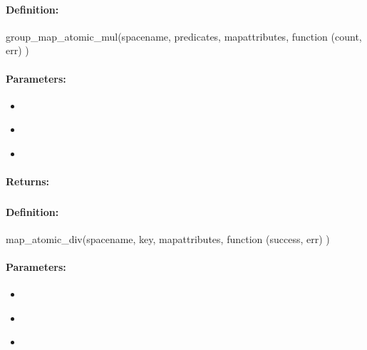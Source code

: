 \paragraph{Definition:}
\begin{javascriptcode}
group_map_atomic_mul(spacename, predicates, mapattributes, function (count, err) {})
\end{javascriptcode}
\paragraph{Parameters:}
\begin{itemize}[noitemsep]
\item {}\\

\item {}\\

\item {}\\

\end{itemize}

\paragraph{Returns:}


\pagebreak
\subsubsection{}
\label{api:nodejs:map_atomic_div}


\paragraph{Definition:}
\begin{javascriptcode}
map_atomic_div(spacename, key, mapattributes, function (success, err) {})
\end{javascriptcode}
\paragraph{Parameters:}
\begin{itemize}[noitemsep]
\item {}\\

\item {}\\

\item {}\\

\end{itemize}

